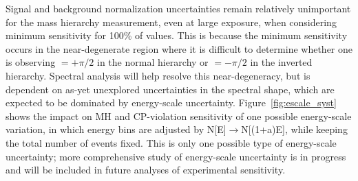 Signal and
background normalization uncertainties remain
relatively unimportant for the mass hierarchy measurement, even at large exposure, when considering
minimum sensitivity for 100\% of \deltacp values. This is because the minimum sensitivity 
occurs in the near-degenerate region where it is difficult to determine
whether one is observing \deltacp $= + \pi/2 $ in the normal hierarchy
or \deltacp $=-\pi/2$ in the inverted hierarchy. Spectral analysis will
help resolve this near-degeneracy, but is dependent on as-yet
unexplored uncertainties in the spectral shape, which are expected to be dominated
by energy-scale uncertainty. Figure~\ref{fig:escale_syst} shows the
impact on MH and CP-violation sensitivity of one possible energy-scale variation, in which
energy bins are adjusted by N[E]$\rightarrow$N[(1+a)E], while keeping the total number of
events fixed. This is only one possible type of energy-scale uncertainty; more comprehensive
study of energy-scale uncertainty is in progress and will be included in
future analyses of experimental sensitivity.
%
